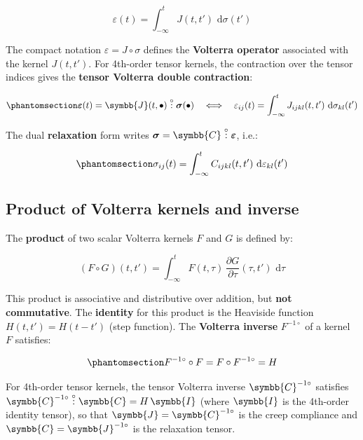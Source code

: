 \documentclass[
  a4paper,
  numbers=noendperiod,
  DIV=12]{scrreprt}
\newcommand{\uuuu}[1]{{\symbb{{#1}}}}
\newcommand{\ud}{{\,\mathrm{d}}}
\newcommand{\volt}[1]{{#1}^{-1\circ}}
\newcommand{\dcirc}{\overset{\circ}{:}}
\begin{document}
\[
\varepsilon(t) = \int_{-\infty}^{t} J(t,t')\,\ud\sigma(t')
\]

The compact notation \(\varepsilon = J \circ \sigma\) defines the
\textbf{Volterra operator} associated with the kernel \(J(t,t')\). For
4th-order tensor kernels, the contraction over the tensor indices gives
the \textbf{tensor Volterra double contraction}:

\begin{equation}\protect\phantomsection\label{eq-volterra-creep}{
\boldsymbol{\varepsilon}(t) = \uuuu{J}(t,\bullet) \dcirc \boldsymbol{\sigma}(\bullet)
\quad\Longleftrightarrow\quad
\varepsilon_{ij}(t) = \int_{-\infty}^{t} J_{ijkl}(t,t')\,\ud\sigma_{kl}(t')
}\end{equation}

The dual \textbf{relaxation} form writes
\(\boldsymbol{\sigma} = \uuuu{C} \dcirc \boldsymbol{\varepsilon}\),
i.e.:

\begin{equation}\protect\phantomsection\label{eq-volterra-relax}{
\sigma_{ij}(t) = \int_{-\infty}^{t} C_{ijkl}(t,t')\,\ud\varepsilon_{kl}(t')
}\end{equation}

\subsection{Product of Volterra kernels and
inverse}\label{product-of-volterra-kernels-and-inverse}

The \textbf{product} of two scalar Volterra kernels \(F\) and \(G\) is
defined by:

\[(F \circ G)(t,t') = \int_{-\infty}^{t} F(t,\tau)\,\frac{\partial G}{\partial \tau}(\tau,t')\,\ud\tau\]

This product is associative and distributive over addition, but
\textbf{not commutative}. The \textbf{identity} for this product is the
Heaviside function \(H(t,t') = H(t-t')\) (step function). The
\textbf{Volterra inverse} \(\volt{F}\) of a kernel \(F\) satisfies:

\begin{equation}\protect\phantomsection\label{eq-volterra-inverse}{
\volt{F} \circ F = F \circ \volt{F} = H
}\end{equation}

For 4th-order tensor kernels, the tensor Volterra inverse
\(\volt{\uuuu{C}}\) satisfies
\(\volt{\uuuu{C}} \dcirc \uuuu{C} = H\,\uuuu{I}\) (where \(\uuuu{I}\) is
the 4th-order identity tensor), so that \(\uuuu{J} = \volt{\uuuu{C}}\)
is the creep compliance and \(\uuuu{C} = \volt{\uuuu{J}}\) is the
relaxation tensor.
\end{document}
